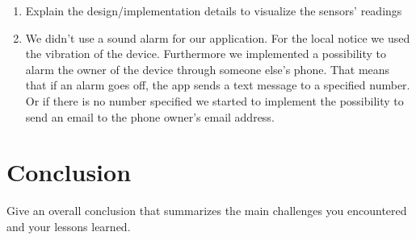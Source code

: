 \documentclass{report}
\begin{document}
\begin{enumerate}
  \item Explain the design/implementation details to visualize the sensors' readings
  \item We didn't use a sound alarm for our application. For the local notice we used the vibration of the device. Furthermore we implemented a possibility to alarm the owner of the device through someone else's phone. That means that if an alarm goes off, the app sends a text message to a specified number. Or if there is no number specified we started to implement the possibility to send an email to the phone owner's email address. 
\end{enumerate}

\section{Conclusion}

Give an overall conclusion that summarizes the main challenges you encountered and your lessons learned.



\end{document}
